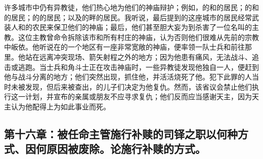 许多城市中仍有异教徒，他们热心地为他们的神庙辩护；例如，的和的居民；的和的居民；的的居民；以及的畔的居民。我听说，最后提到的这座城市的居民经常武装人和的农民来保卫他们的神庙；最后，他们甚至胆大妄为到杀害了一位名叫的主教。这位主教曾命令拆除该市和所有村庄的神庙，认为否则他们很难从先前的宗教中皈依。他听说在的一个地区有一座非常宽敞的神庙，便率领一队士兵和前往那里。他站在远离冲突现场、箭矢射程之外的地方；因为他患有痛风，无法战斗、追击或逃跑。当士兵和角斗士正在攻击神庙时，一些异教徒发现他独自一人，便赶到他与战斗分离的地方；他们突然出现，抓住他，并活活烧死了他。犯下此罪的人当时未被发现，但后来被查出，的儿子们决定为他复仇。然而，该省议会禁止他们执行这一计划，并宣布的亲属或朋友不应寻求复仇；他们反而应当感谢天主，因为天主认为他配得上为如此事业而死。\par


\subsection{第十六章：被任命主管施行补赎的司铎之职以何种方式、因何原因被废除。论施行补赎的方式。}

